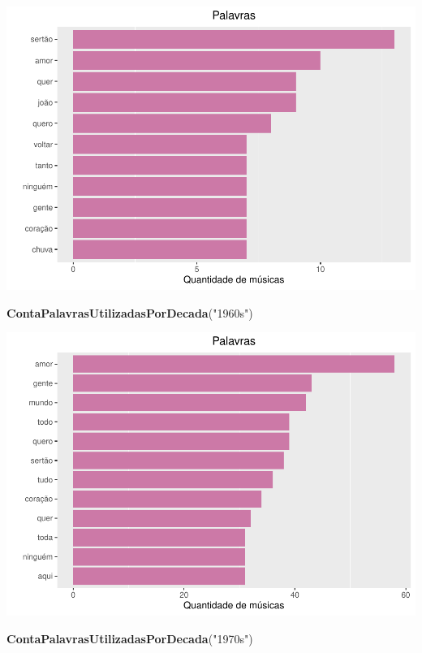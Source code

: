 \documentclass[]{article}
\newenvironment{Shaded}{\begin{snugshade}}{\end{snugshade}}
\newcommand{\KeywordTok}[1]{\textcolor[rgb]{0.13,0.29,0.53}{\textbf{#1}}}
\newcommand{\NormalTok}[1]{#1}
\newcommand{\StringTok}[1]{\textcolor[rgb]{0.31,0.60,0.02}{#1}}
\begin{document}
\includegraphics{avaliacaoLetrasDeForro_files/figure-latex/unnamed-chunk-5-1.pdf}

\begin{Shaded}
\begin{Highlighting}[]
\KeywordTok{ContaPalavrasUtilizadasPorDecada}\NormalTok{(}\StringTok{"1960s"}\NormalTok{)}
\end{Highlighting}
\end{Shaded}

\includegraphics{avaliacaoLetrasDeForro_files/figure-latex/unnamed-chunk-5-2.pdf}

\begin{Shaded}
\begin{Highlighting}[]
\KeywordTok{ContaPalavrasUtilizadasPorDecada}\NormalTok{(}\StringTok{"1970s"}\NormalTok{)}
\end{Highlighting}
\end{Shaded}
\end{document}

